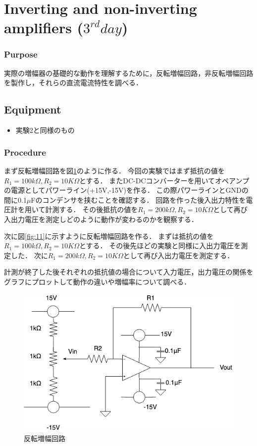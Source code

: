 \documentclass[11pt, a4paper,twocolumn]{jarticle}
\begin{document}
\section{Inverting and non-inverting amplifiers ($3^{rd} day$)}
\subsubsection{Purpose}
実際の増幅器の基礎的な動作を理解するために，反転増幅回路，非反転増幅回路を製作し，それらの直流電流特性を調べる．
\subsection{Equipment}
\begin{itemize}
    \item 実験2と同様のもの
\end{itemize}
\subsubsection{Procedure}
まず反転増幅回路を図\ref{fig:10}のように作る．
今回の実験ではまず抵抗の値を$R_1=100k\Omega,R_2=10K\Omega$とする．
またDC-DCコンバーターを用いてオペアンプの電源としてパワーライン(+15V,-15V)を作る．
この際パワーラインとGNDの間に0.1$\mu$Fのコンデンサを挟むことを確認する．
回路を作った後入出力特性を電圧計を用いて計測する．
その後抵抗の値を$R_1=200k\Omega,R_2=10K\Omega$として再び入出力電圧を測定しどのように動作が変わるのかを観察する．

次に図\ref{fig:11}に示すように反転増幅回路を作る．
まずは抵抗の値を$R_1=100k\Omega,R_2=10K\Omega$とする．
その後先ほどの実験と同様に入出力電圧を測定した．
次に$R_1=200k\Omega,R_2=10K\Omega$として再び入出力電圧を測定する．

計測が終了した後それぞれの抵抗値の場合について入力電圧，出力電圧の関係をグラフにプロットして動作の違いや増幅率について調べる．

\begin{figure}[htbp]
 \begin{center}
  \includegraphics[width=0.8\linewidth]{fig10.png}
 \end{center}
 \caption{反転増幅回路}
 \label{fig:10}
\end{figure}
\end{document}
